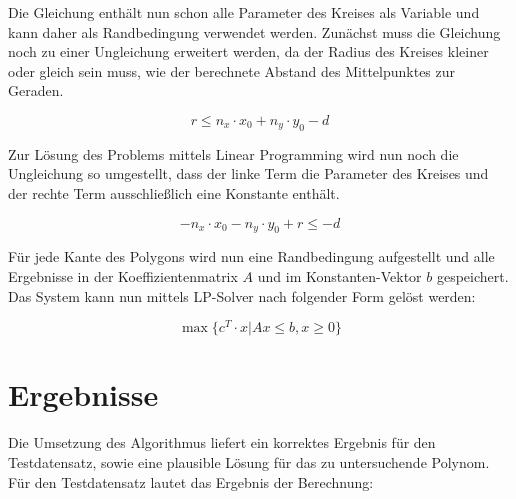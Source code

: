 \documentclass[12pt]{scrartcl}
\begin{document}
Die Gleichung enthält nun schon alle Parameter des Kreises als Variable und kann daher als Randbedingung verwendet werden.
Zunächst muss die Gleichung noch zu einer Ungleichung erweitert werden, da der Radius des Kreises kleiner oder gleich sein muss, wie der berechnete Abstand des Mittelpunktes zur Geraden.

\begin{equation}
    r \leq n_x \cdot x_0 + n_y \cdot y_0 - d
\end{equation}

Zur Lösung des Problems mittels Linear Programming wird nun noch die Ungleichung so umgestellt, dass der linke Term die Parameter des Kreises und der rechte Term ausschließlich eine Konstante enthält.

\begin{equation}
    -n_x \cdot x_0 - n_y \cdot y_0 + r \leq - d
\end{equation}

Für jede Kante des Polygons wird nun eine Randbedingung aufgestellt und alle Ergebnisse in der Koeffizientenmatrix $A$ und im Konstanten-Vektor $b$ gespeichert.
Das System kann nun mittels LP-Solver nach folgender Form gelöst werden:

\begin{equation}
    \max\{c^T \cdot x | Ax \leq b, x \geq 0\}
\end{equation}

\section{Ergebnisse}
Die Umsetzung des Algorithmus liefert ein korrektes Ergebnis für den Testdatensatz, sowie eine plausible Lösung für das zu untersuchende Polynom.
Für den Testdatensatz lautet das Ergebnis der Berechnung:
\end{document}
